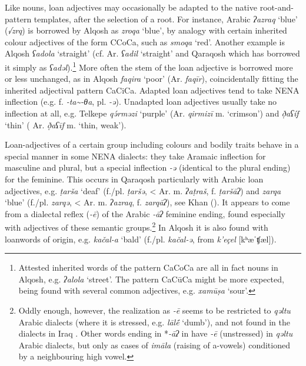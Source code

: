\documentclass[output=paper]{langsci/langscibook}
\begin{document}
Like nouns, loan adjectives may occasionally be adapted to the native {root-and-pattern} templates, after the selection of a {root}. For instance, Arabic \textit{ʔazraq} ‘blue’ (\textit{√zrq}) is borrowed by  Alqosh as \textit{zroqa} ‘blue’, by {analogy} with certain inherited colour adjectives of the form CCoCa, such as \textit{smoqa} ‘red’. Another example is  Alqosh \textit{ʕadola} ‘straight’ (cf.  Ar. \textit{ʕadil} ‘straight’ and  Qaraqosh which has borrowed it simply as \textit{ʕadəl}).\footnote{Attested inherited words of the pattern CaCoCa are all in fact nouns in  Alqosh, e.g. \textit{ʔalola} ‘street’. The pattern CaCūCa might be more expected, being found with several common adjectives, e.g. \textit{xamūṣa} ‘sour’.} More often the {stem} of the loan adjective is borrowed more or less unchanged, as in  Alqosh \textit{faqira} ‘poor’ (Ar. \textit{faqīr}), coincidentally fitting the inherited adjectival pattern CaCiCa. Adapted loan adjectives tend to take NENA {inflection} (e.g. f. \textit{{}-ta{\textasciitilde}-θa}, pl. \textit{{}-ə}). Unadapted loan adjectives usually take no {inflection} at all, e.g.  Telkepe \textit{qə́rməzi} ‘purple’ (Ar. \textit{qirmizī} m. ‘crimson’) and \textit{ð̣aʕíf} ‘thin’ ( Ar. \textit{ð̣aʕīf} m. ‘thin, weak’).

Loan-adjectives of a certain group including colours and bodily traits behave in a special manner in some NENA dialects: they take Aramaic {inflection} for masculine and plural, but a special {inflection} \textit{\nobreakdash-ə} (identical to the plural ending) for the feminine. This occurs in  Qaraqosh particularly with Arabic loan adjectives, e.g. \textit{ṭarša} ‘deaf’ (f./pl. \textit{ṭaršə}, < Ar. m. \textit{ʔaṭraš}, f. \textit{ṭaršāʔ}) and \textit{zarqa} ‘blue’ (f./pl. \textit{zarqə}, < Ar. m. \textit{ʔazraq}, f. \textit{zarqāʔ}), see Khan (\citeyear[219]{Khan2002}). It appears to come from a dialectal reflex (\textit{\nobreakdash-ē}) of the Arabic \textit{\nobreakdash-āʔ} feminine ending, found especially with adjectives of these semantic groups.\footnote{Oddly enough, however, the realization as \textit{-ē} seems to be restricted to  \textit{qəltu} Arabic dialects (where it is stressed, e.g.  \textit{lāl\'{ē}} ‘dumb’), and not found in the dialects in Iraq \citep[76]{Jastrow1978}. Other words ending in *\textit{{}-āʔ} in have \textit{{}-ē} (unstressed) in \textit{qəltu} Arabic dialects, but only as cases of \textit{imāla} (raising of a-vowels) conditioned by a neighbouring high vowel.}  In  Alqosh it is also found with {loanwords} of  origin, e.g. \textit{kačal-a} ‘bald’ (f./pl. \textit{kačal\nobreakdash-ə}, from  \textit{k’eçel} [kʰæˈʧæl]).
\end{document}
